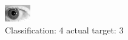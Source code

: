 \begin{figure}[h!]
\begin{center}
\includegraphics[width=0.60\columnwidth]{figures/ID208_class_4_target_3.png}
\end{center}
\caption{ Classification: 4 actual target: 3}
\label{fig:ID208_class_4_target_3}
\end{figure}
